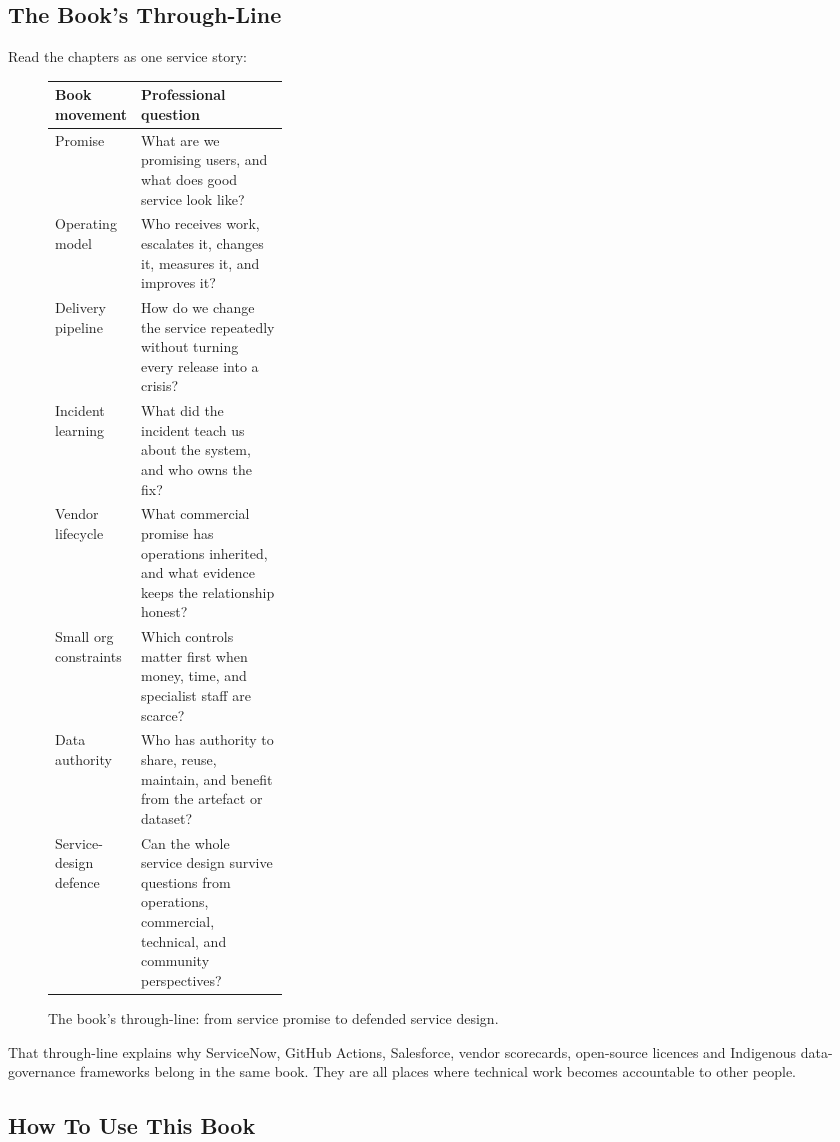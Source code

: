 \documentclass[11pt,openany]{book}
\begin{document}
\subsection{The Book's Through-Line}


Read the chapters as one service story:



\begin{figure}[H]
\centering
\footnotesize
\renewcommand{\arraystretch}{1.18}
\begin{tabularx}{\linewidth}{@{}p{0.30\linewidth}X@{}}
\toprule
\textbf{Book movement} & \textbf{Professional question} \\
\midrule
Promise & What are we promising users, and what does good service look like? \\
Operating model & Who receives work, escalates it, changes it, measures it, and improves it? \\
Delivery pipeline & How do we change the service repeatedly without turning every release into a crisis? \\
Incident learning & What did the incident teach us about the system, and who owns the fix? \\
Vendor lifecycle & What commercial promise has operations inherited, and what evidence keeps the relationship honest? \\
Small org constraints & Which controls matter first when money, time, and specialist staff are scarce? \\
Data authority & Who has authority to share, reuse, maintain, and benefit from the artefact or dataset? \\
Service-design defence & Can the whole service design survive questions from operations, commercial, technical, and community perspectives? \\
\bottomrule
\end{tabularx}
\caption{The book's through-line: from service promise to defended service design.}
\end{figure}


That through-line explains why ServiceNow, GitHub Actions, Salesforce, vendor scorecards, open-source licences and Indigenous data-governance frameworks belong in the same book. They are all places where technical work becomes accountable to other people.



\subsection{How To Use This Book}
\end{document}

